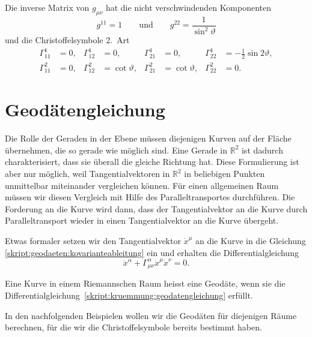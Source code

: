 Die inverse Matrix von $g_{\mu\nu}$ hat die nicht verschwindenden
Komponenten
\[
g^{11} = 1
\qquad\text{und}\qquad
g^{22} = \frac1{\sin^2\vartheta}
\]
und die Christoffelsymbole 2.~Art
\begin{equation}
\begin{aligned}
 \Gamma_{11}^1
&=0,
&\Gamma_{12}^1
&=0,
&\Gamma_{21}^1
&=0,
&\Gamma_{22}^1
&=-\frac12\sin2\vartheta,
\\
 \Gamma_{11}^2
&=0,
&\Gamma_{12}^2
&=\cot\vartheta,
&\Gamma_{21}^2
&=\cot\vartheta,
&\Gamma_{22}^2
&=0.
\end{aligned}
\label{skript:kruemmung:christoffelkugel}
\end{equation}


\section{Geodätengleichung}
Die Rolle der Geraden in der Ebene müssen diejenigen Kurven auf der
Fläche übernehmen, die so gerade wie möglich sind. 
Eine Gerade in $\mathbb R^2$ ist dadurch charakterisiert, dass sie überall
die gleiche Richtung hat. 
Diese Formulierung ist aber nur möglich, weil Tangentialvektoren
in $\mathbb R^2$ in
beliebigen Punkten unmittelbar miteinander vergleichen können.
Für einen allgemeinen Raum müssen wir diesen Vergleich mit Hilfe
des Paralleltransportes durchführen.
Die Forderung an die Kurve wird dann, dass der Tangentialvektor
an die Kurve durch Paralleltransport wieder in einen Tangentialvektor
an die Kurve übergeht.

Etwas formaler setzen wir den Tangentialvektor $\dot x^\mu$ an die
Kurve in die Gleichung \eqref{skript:geodaeten:kovarianteableitung} ein und
erhalten die Differentialgleichung 
\begin{equation}
\ddot x^\alpha+\Gamma_{\mu\nu}^\alpha \dot x^\mu\dot x^\nu=0.
\label{skript:kruemmung:geodatengleichung}
\end{equation}
%

\begin{definition}
Eine Kurve in einem Riemannschen Raum heisst eine Geodäte, wenn sie
die Differentialgleichung~\eqref{skript:kruemmung:geodatengleichung}
erfüllt.
\end{definition}

In den nachfolgenden Beispielen wollen wir die Geodäten für diejenigen
Räume berechnen, für die wir die Christoffelsymbole bereits bestimmt
haben.

%
%

